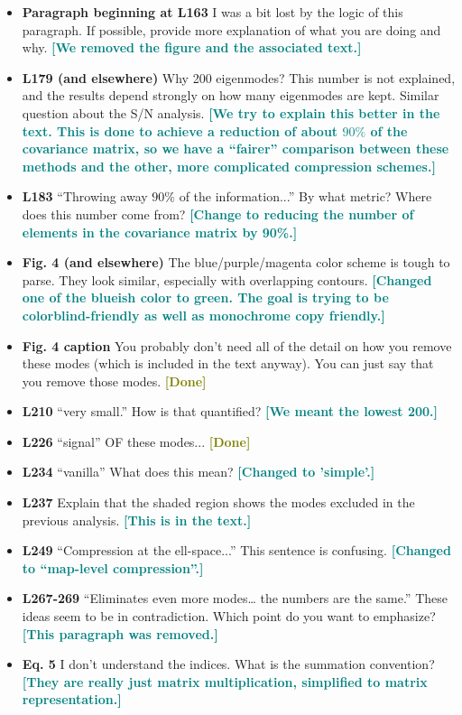 \documentclass{article}
\newcommand\reply[1]{{\bf {\textcolor{teal}{[#1]}}}}
\newcommand\done{{\bf {\textcolor{olive}{[Done]}}}}
\begin{document}
\begin{itemize}
		\item \textbf{Paragraph beginning at L163} I was a bit lost by the logic of this paragraph. If possible, provide more explanation of what you are doing and why. \reply{We removed the figure and the associated text.}
		\item \textbf{L179 (and elsewhere)} Why 200 eigenmodes? This number is not explained, and the results depend strongly on how many eigenmodes are kept. Similar question about the S/N analysis. \reply{We try to explain this better in the text. This is done to achieve a reduction of about $90\%$ of the covariance matrix, so we have a “fairer” comparison between these methods and the other, more complicated compression schemes.}
		\item \textbf{L183} “Throwing away $90\%$ of the information...” By what metric? Where does this number come from? \reply{Change to reducing the number of elements in the covariance matrix by 90\%.}
		\item \textbf{Fig. 4 (and elsewhere)} The blue/purple/magenta color scheme is tough to parse. They look similar, especially with overlapping contours. \reply{Changed one of the blueish color to green. The goal is trying to be colorblind-friendly as well as monochrome copy friendly.}
		\item \textbf{Fig. 4 caption} You probably don’t need all of the detail on how you remove these modes (which is included in the text anyway). You can just say that you remove those modes. \done
		\item \textbf{L210} “very small.” How is that quantified? \reply{We meant the lowest 200.}
		\item \textbf{L226} “signal” OF these modes... \done
		\item \textbf{L234} “vanilla” What does this mean? \reply{Changed to 'simple'.}
		\item \textbf{L237} Explain that the shaded region shows the modes excluded in the previous analysis. \reply{This is in the text.}
		\item \textbf{L249} “Compression at the ell-space...” This sentence is confusing. \reply{Changed to “map-level compression”.}
		\item \textbf{L267-269} “Eliminates even more modes… the numbers are the same.” These ideas seem to be in contradiction. Which point do you want to emphasize? \reply{This paragraph was removed.}
		\item \textbf{Eq. 5} I don’t understand the indices. What is the summation convention? \reply{They are really just matrix multiplication, simplified to matrix representation.}

\end{itemize}
\end{document}
